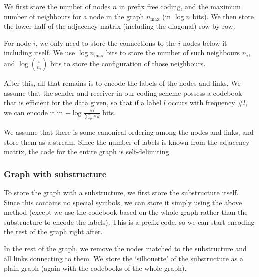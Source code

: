 \documentclass{article}
\begin{document}
We first store the number of nodes $n$ in prefix free coding, and the maximum number of neighbours for a node in the graph $n_{\mbox{max}}$ (in $\log n$ bits). We then store the lower half of the adjacency matrix (including the diagonal) row by row.

For node $i$, we only need to store the connections to the $i$ nodes below it including itself. We use $\log n_{\mbox{max}}$ bits to store the number of such neighbours $n_i$, and $\log{i \choose n_i}$ bits to store the configuration of those neighbours.


After this, all that remains is to encode the labels of the nodes and links. We assume that the sender and receiver in our coding scheme possess a codebook that is efficient for the data given, so that if a label $l$ occurs with frequency $\#l$, we can encode it in $-\log \frac{\#l}{\sum_k \#k}$ bits. 

We assume that there is some canonical ordering among the nodes and links, and store them as a stream. Since the number of labels is known from the adjacency matrix, the code for the entire graph is self-delimiting.

\subsubsection*{Graph with substructure}  

To store the graph with a substructure, we first store the substructure itself. Since this contains no special symbols, we can store it simply using the above method (except we use the codebook based on the whole graph rather than the substructure to encode the labels). This is a prefix code, so we can start encoding the rest of the graph right after.

In the rest of the graph, we remove the nodes matched to the substructure and all links connecting to them. We store the `silhouette' of the substructure as a plain graph (again with the codebooks of the whole graph).
\end{document}

